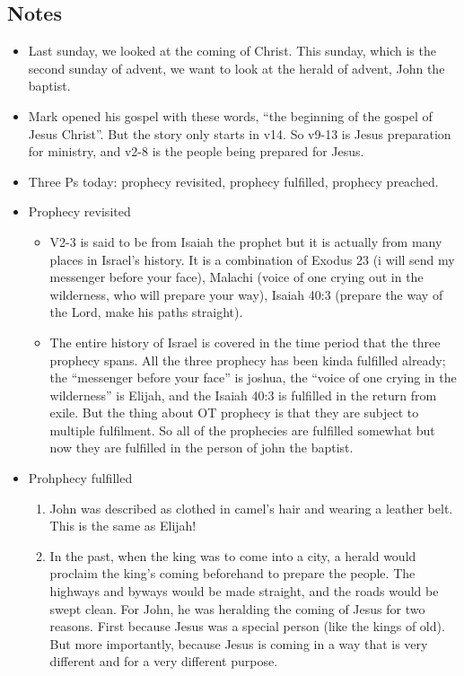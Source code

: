 \subsection*{Notes}
\begin{itemize}
  \item{Last sunday, we looked at the coming of Christ. This sunday, which is the second sunday of advent, we want to look at the herald of advent, John the baptist.}
  \item{Mark opened his gospel with these words, “the beginning of the gospel of Jesus Christ”. But the story only starts in v14. So v9-13 is Jesus preparation for ministry, and v2-8 is the people being prepared for Jesus.}
  \item{Three Ps today: prophecy revisited, prophecy fulfilled, prophecy preached.}
  \item{Prophecy revisited 
  \begin{itemize}
    \item{V2-3 is said to be from Isaiah the prophet but it is actually from many places in Israel’s history. It is a combination of Exodus 23 (i will send my messenger before your face), Malachi (voice of one crying out in the wilderness, who will prepare your way), Isaiah 40:3 (prepare the way of the Lord, make his paths straight).}
    \item{The entire history of Israel is covered in the time period that the three prophecy spans. All the three prophecy has been kinda fulfilled already; the “messenger before your face” is joshua, the “voice of one crying in the wilderness” is Elijah, and the Isaiah 40:3 is fulfilled in the return from exile. But the thing about OT prophecy is that they are subject to multiple fulfilment. So all of the prophecies are fulfilled somewhat but now they are fulfilled in the person of john the baptist.}
  \end{itemize}}
  \item{Prohphecy fulfilled
  \begin{enumerate}
    \item{John was described as clothed in camel’s hair and wearing a leather belt. This is the same as Elijah!}
    \item{In the past, when the king was to come into a city, a herald would proclaim the king’s coming beforehand to prepare the people. The highways and byways would be made straight, and the roads would be swept clean. For John, he was heralding the coming of Jesus for two reasons. First because Jesus was a special person (like the kings of old). But more importantly, because Jesus is coming in a way that is very different and for a very different purpose.}

\end{enumerate}}
\end{itemize}
